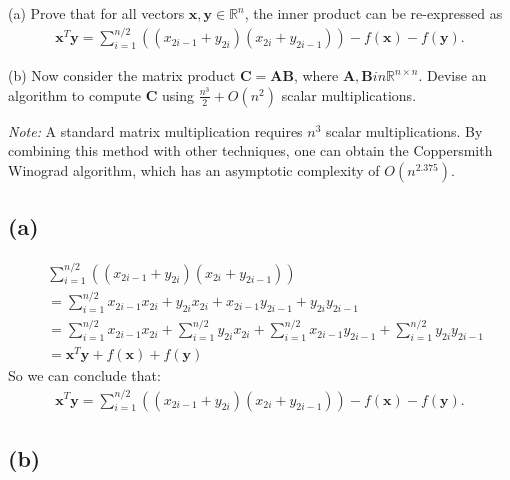\documentclass{article}
\newcommand{\R}{\mathbb{R}}
\begin{document}
\noindent 
(a) Prove that for all vectors \(\bm{x}, \bm{y} \in \R^n\), the inner product can be re-expressed as
\begin{align*}
    \bm{x}^T\bm{y} = \sum_{i = 1}^{n / 2}((x_{2i - 1} + y_{2i})(x_{2i} + y_{2i - 1})) - f(\bm{x}) - f(\bm{y}).
\end{align*}

\noindent 
(b) Now consider the matrix product \(\bm{C} = \bm{A}\bm{B}\), where \(\bm{A}, \bm{B} in \R^{n \times n}\). Devise an algorithm to compute \(\bm{C}\) using
\(\frac{n^3}{2} + \textit{O}(n^2)\) scalar multiplications.

\noindent
\textit{Note:} A standard matrix multiplication requires \(n^3\) scalar multiplications. By combining this method with other techniques, one can obtain
the Coppersmith Winograd algorithm, which has an asymptotic complexity of \(O(n^{2.375})\).

\subsection*{(a)}
\begin{align*}
    &\sum_{i = 1}^{n / 2}((x_{2i - 1} + y_{2i})(x_{2i} + y_{2i - 1})) \\
    &=\sum_{i = 1}^{n / 2}x_{2i - 1}x_{2i} + y_{2i}x_{2i} + x_{2i - 1}y_{2i - 1} +  y_{2i}y_{2i - 1} \\
    &=\sum_{i = 1}^{n / 2}x_{2i - 1}x_{2i} + \sum_{i = 1}^{n / 2}y_{2i}x_{2i} + \sum_{i = 1}^{n / 2}x_{2i - 1}y_{2i - 1} +  \sum_{i = 1}^{n / 2}y_{2i}y_{2i - 1} \\
    &= \bm{x}^T\bm{y} + f(\bm{x}) + f(\bm{y})
\end{align*}
So we can conclude that:
\begin{align*}
    \bm{x}^T\bm{y} = \sum_{i = 1}^{n / 2}((x_{2i - 1} + y_{2i})(x_{2i} + y_{2i - 1})) - f(\bm{x}) - f(\bm{y}).
\end{align*}

\subsection*{(b)}
\end{document}
